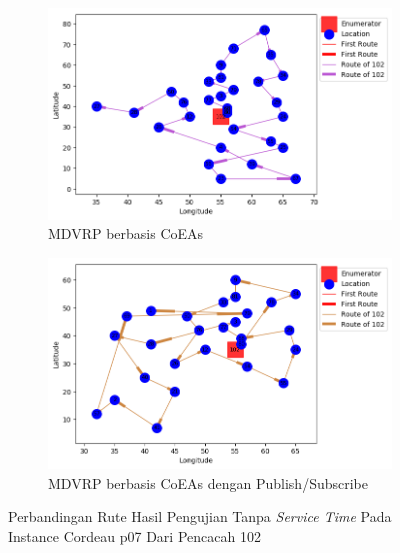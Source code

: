 \begin{figure}[H]
	\centering
	\begin{subfigure}[t]{\textwidth}
		\centering
		\includegraphics[width=\textwidth]{Resources/Images/cordeau_p07/cordeau_p07_notw_102_coes}
		\caption{MDVRP berbasis CoEAs}
		\label{fig:cordeau_p07_notw_102_coes}
	\end{subfigure}
	\begin{subfigure}[t]{\textwidth}
		\centering
		\includegraphics[width=\textwidth]{Resources/Images/cordeau_p07/cordeau_p07_notw_102_pubsub_coes}
		\caption{MDVRP berbasis CoEAs dengan Publish/Subscribe}
		\label{fig:cordeau_p07_notw_102_pubsub_coes}
	\end{subfigure}
	\caption{Perbandingan Rute Hasil Pengujian Tanpa \textit{Service Time} Pada Instance Cordeau p07 Dari Pencacah 102}
	\label{fig:cordeau_p07_notw_102}
\end{figure}


